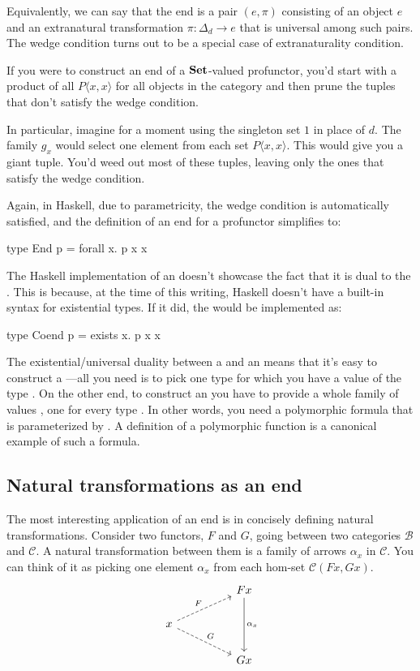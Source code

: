 \documentclass[DaoFP]{subfiles}
\begin{document}
Equivalently, we can say that the end is a pair $(e, \pi)$ consisting of an object $e$ and an  extranatural transformation $\pi \colon \Delta_d \to e$ that is universal among such pairs. The wedge condition turns out to be a special case of extranaturality condition.

If you were to construct an end of a $\mathbf{Set}$-valued profunctor, you'd start with a product of all $P \langle x, x \rangle$ for all objects in the category and then prune the tuples that don't satisfy the wedge condition. 

In particular, imagine for a moment using the singleton set $1$ in place of $d$. The family $g_x$ would select one element from each set $P \langle x, x \rangle$. This would give you a giant tuple. You'd weed out most of these tuples, leaving only the ones that satisfy the wedge condition. 

Again, in Haskell, due to parametricity, the wedge condition is automatically satisfied, and the definition of an end for a profunctor  simplifies to:

\begin{haskell}
type End p = forall x. p x x
\end{haskell}

The Haskell implementation of an  doesn't showcase the fact that it is dual to the . This is because, at the time of this writing, Haskell doesn't have a built-in syntax for existential types. If it did, the  would be implemented as:
\begin{haskell}
type Coend p = exists x. p x x
\end{haskell}

The existential/universal duality between a  and an  means that it's easy to construct a ---all you need is to pick one type  for which you have a value of the type . On the other end, to construct an  you have to provide a whole family of values , one for every type . In other words, you need a polymorphic formula that is parameterized by . A definition of a polymorphic function is a canonical example of such a formula.


\subsection{Natural transformations as an end}

The most interesting application of an end is in concisely defining natural transformations. Consider two functors, $F$ and $G$, going between two categories  $\mathcal{B}$ and $\mathcal{C}$. A natural transformation between them is a family of arrows $\alpha_x$ in $\mathcal{C}$. You can think of it as picking one element $\alpha_x$ from each hom-set  $\mathcal{C} (F x, G x)$.
\[
 \begin{tikzcd}
 && F x
 \arrow[dd, "\alpha_x"]
 \\
 x
 \arrow[urr, dashed, "F"]
 \arrow[drr, dashed, "G"]
 \\
 && G x
 \end{tikzcd}
\]
\end{document}
